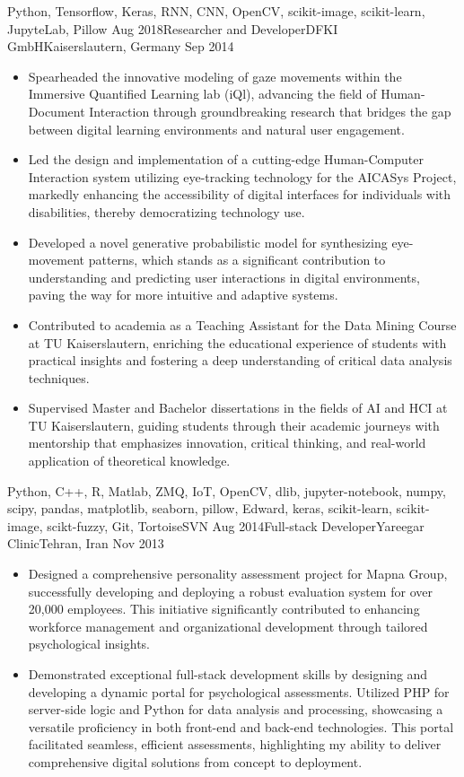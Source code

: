 \begin{experiences}
{\begin{itemize}
	\end{itemize}
}
{Python, Tensorflow, Keras, RNN, CNN, OpenCV, scikit-image, scikit-learn, JupyteLab, Pillow}
\emptySeparator
  \experience
  {Aug 2018}{Researcher and Developer}{DFKI GmbH}{Kaiserslautern, Germany}
  {Sep 2014} {
    \begin{itemize}
		\item Spearheaded the innovative modeling of gaze movements within the Immersive Quantified Learning lab (iQl), advancing the field of Human-Document Interaction through groundbreaking research that bridges the gap between digital learning environments and natural user engagement.
		\item Led the design and implementation of a cutting-edge Human-Computer Interaction system utilizing eye-tracking technology for the AICASys Project, markedly enhancing the accessibility of digital interfaces for individuals with disabilities, thereby democratizing technology use.
		\item Developed a novel generative probabilistic model for synthesizing eye-movement patterns, which stands as a significant contribution to understanding and predicting user interactions in digital environments, paving the way for more intuitive and adaptive systems.
		\item Contributed to academia as a Teaching Assistant for the Data Mining Course at TU Kaiserslautern, enriching the educational experience of students with practical insights and fostering a deep understanding of critical data analysis techniques.
		\item Supervised Master and Bachelor dissertations in the fields of AI and HCI at TU Kaiserslautern, guiding students through their academic journeys with mentorship that emphasizes innovation, critical thinking, and real-world application of theoretical knowledge.

    \end{itemize}
  }
    {Python, C++, R, Matlab, ZMQ, IoT, OpenCV, dlib, jupyter-notebook, numpy, scipy, pandas, matplotlib, seaborn, pillow, Edward, keras, scikit-learn, scikit-image, scikt-fuzzy, Git, TortoiseSVN}
    \emptySeparator
  \experience
  {Aug 2014}{Full-stack Developer}{Yareegar Clinic}{Tehran, Iran}
  {Nov 2013} {
    \begin{itemize}
		\item Designed a comprehensive personality assessment project for Mapna Group, successfully developing and deploying a robust evaluation system for over 20,000 employees. This initiative significantly contributed to enhancing workforce management and organizational development through tailored psychological insights.
		\item Demonstrated exceptional full-stack development skills by designing and developing a dynamic portal for psychological assessments. Utilized PHP for server-side logic and Python for data analysis and processing, showcasing a versatile proficiency in both front-end and back-end technologies. This portal facilitated seamless, efficient assessments, highlighting my ability to deliver comprehensive digital solutions from concept to deployment.


\end{itemize}}
\end{experiences}
